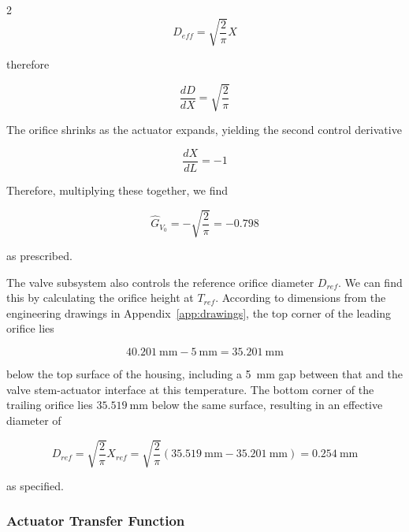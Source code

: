 \documentclass[12pt, letterpaper]{report}%
\newcounter{mycounter}           %
\newcounter{sub}[mycounter]      %
\newcommand{\AzeroExact}{\SI{0.254}{\milli\meter}}
\newcommand{\GV}{\num{-0.798}}
\begin{document}
\begin{multicols}{2}
				\begin{equation}
					D_{eff} = \sqrt{\frac{2}{\pi}} X
				\end{equation}

				therefore

				\begin{equation}
					\frac{dD}{dX} = \sqrt{\frac{2}{\pi}}
				\end{equation}

				\end{multicols}

				The orifice shrinks as the actuator expands, yielding the second control derivative

				\begin{equation}
					\frac{dX}{dL} = -1
				\end{equation}

				Therefore, multiplying these together, we find

				\begin{equation}
					\hat{G}_{V_0} = -\sqrt{\frac{2}{\pi}} = \GV
				\end{equation}

				as prescribed.

				The valve subsystem also controls the reference orifice diameter $D_{ref}$.
				We can find this by calculating the orifice height at $T_{ref}$.
				According to dimensions from the engineering drawings in Appendix~\ref{app:drawings}, the top corner of the leading orifice lies

				\begin{equation*}
					\SI{40.201}{\milli\meter} - \SI{5}{\milli\meter} = \SI{35.201}{\milli\meter}
				\end{equation*}

				below the top surface of the housing, including a \SI{5}{\milli\meter} gap between that and the valve stem-actuator interface at this temperature.
				The bottom corner of the trailing orifice lies $\SI{35.519}{\milli\meter}$ below the same surface, resulting in an effective diameter of

				\begin{equation}
					D_{ref} = \sqrt{\frac{2}{\pi}} X_{ref} = \sqrt{\frac{2}{\pi}} (\SI{35.519}{\milli\meter} - \SI{35.201}{\milli\meter}) = \AzeroExact
					\label{eq:Dref}
				\end{equation}

				as specified.

			\subsubsection{Actuator Transfer Function}
			\label{subsubsec:design:just:TF:act}
\end{document}
